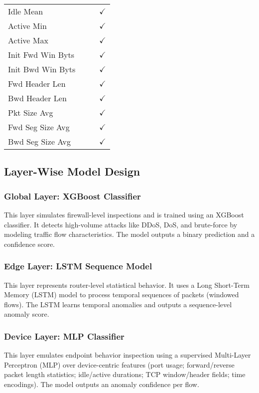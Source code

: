 \documentclass[conference]{IEEEtran}
\begin{document}
\begin{table}[htbp]
\begin{tabular}{|l|c|c|c|}
Idle Mean &  &  & $\checkmark$ \\
Active Min &  &  & $\checkmark$ \\
Active Max &  &  & $\checkmark$ \\
Init Fwd Win Byts &  &  & $\checkmark$ \\
Init Bwd Win Byts &  &  & $\checkmark$ \\
Fwd Header Len &  &  & $\checkmark$ \\
Bwd Header Len &  &  & $\checkmark$ \\
Pkt Size Avg &  &  & $\checkmark$ \\
Fwd Seg Size Avg &  &  & $\checkmark$ \\
Bwd Seg Size Avg &  &  & $\checkmark$ \\
\hline
\end{tabular}
\label{tab:feature_allocation}
\end{table}

\subsection{Layer-Wise Model Design}

\subsubsection{Global Layer: XGBoost Classifier}
This layer simulates firewall-level inspections and is trained using an XGBoost classifier. It detects high-volume attacks like DDoS, DoS, and brute-force by modeling traffic flow characteristics. The model outputs a binary prediction and a confidence score.

\subsubsection{Edge Layer: LSTM Sequence Model}
This layer represents router-level statistical behavior. It uses a Long Short-Term Memory (LSTM) model to process temporal sequences of packets (windowed flows). The LSTM learns temporal anomalies and outputs a sequence-level anomaly score.

\subsubsection{Device Layer: MLP Classifier}
This layer emulates endpoint behavior inspection using a supervised Multi-Layer Perceptron (MLP) over device-centric features (port usage; forward/reverse packet length statistics; idle/active durations; TCP window/header fields; time encodings). The model outputs an anomaly confidence per flow.
\end{document}
